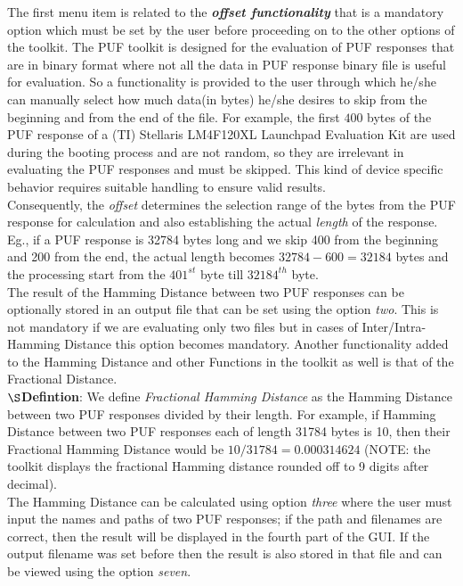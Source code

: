The first menu item is related to the \emph{\textbf{offset functionality}} that is a mandatory option which must be set by the user before proceeding on to the other options of the toolkit. The PUF toolkit is designed for the evaluation of PUF responses that are in binary format where not all the data in PUF response binary file is useful for evaluation. So a functionality is provided to the user through which he/she can manually select how much data(in bytes) he/she desires to skip from the beginning and from the end of the file.
For example, the first $400$ bytes of the PUF response of a (TI) Stellaris LM4F120XL Launchpad Evaluation Kit are used during the booting process and are not random, so they are irrelevant in evaluating the PUF responses and must be skipped. This kind of device specific behavior requires suitable handling to ensure valid results.\\

Consequently, the \emph{offset} determines the selection range of the bytes from the PUF response for calculation and also establishing the actual \emph{length} of the response. Eg., if a PUF response is 32784 bytes long and we skip 400 from the beginning and 200 from the end, the actual length becomes $32784-600 = 32184$ bytes and the processing start from the $401^{st}$ byte till $32184^{th}$ byte.\\

The result of the Hamming Distance between two PUF responses can be optionally stored in an output file that can be set using the option \emph{two}. This is not mandatory if we are evaluating only two files but in cases of Inter/Intra-Hamming Distance this option becomes mandatory. Another functionality added to the Hamming Distance and other Functions in the toolkit as well is that of the Fractional Distance.\\

\textbf{$\S$Defintion}: We define \emph{Fractional Hamming Distance} as the Hamming Distance between two PUF
responses divided by their length. For example, if Hamming Distance between two PUF responses each of length 31784 bytes is 10, then their Fractional Hamming Distance would be $ 10 / 31784 = 0.000314624$ (NOTE: the toolkit displays the fractional Hamming distance rounded off to 9 digits after decimal).\\

The Hamming Distance can be calculated using option \emph{three} where the user must input the names and paths of two PUF responses; if the path and filenames are correct, then the result will be displayed in the fourth part of the GUI. If the output filename was set before then the result is also stored in that file and can be viewed using the option \emph{seven}.\\

